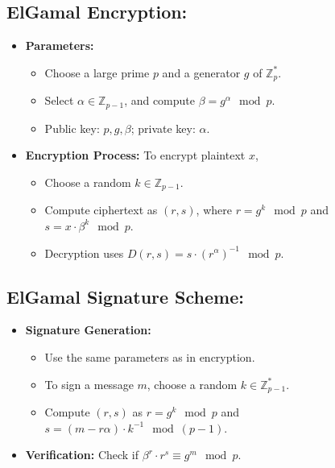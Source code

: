 \documentclass[12pt]{article}
\begin{document}
\subsection*{ElGamal Encryption:}
\begin{itemize}
    \item \textbf{Parameters:}
    \begin{itemize}
        \item Choose a large prime \( p \) and a generator \( g \) of \( \mathbb{Z}_p^* \).
        \item Select \( \alpha \in \mathbb{Z}_{p-1} \), and compute \( \beta = g^\alpha \mod p \).
        \item Public key: \( p, g, \beta \); private key: \( \alpha \).
    \end{itemize}
    \item \textbf{Encryption Process:} To encrypt plaintext \( x \),
    \begin{itemize}
        \item Choose a random \( k \in \mathbb{Z}_{p-1} \).
        \item Compute ciphertext as \( (r, s) \), where \( r = g^k \mod p \) and \( s = x \cdot \beta^k \mod p \).
        \item Decryption uses \( D(r, s) = s \cdot (r^\alpha)^{-1} \mod p \).
    \end{itemize}
\end{itemize}

\subsection*{ElGamal Signature Scheme:}
\begin{itemize}
    \item \textbf{Signature Generation:}
    \begin{itemize}
        \item Use the same parameters as in encryption.
        \item To sign a message \( m \), choose a random \( k \in \mathbb{Z}_{p-1}^* \).
        \item Compute \( (r, s) \) as \( r = g^k \mod p \) and \( s = (m - r\alpha) \cdot k^{-1} \mod (p-1) \).
    \end{itemize}
    \item \textbf{Verification:} Check if \( \beta^r \cdot r^s \equiv g^m \mod p \).
\end{itemize}
\end{document}
